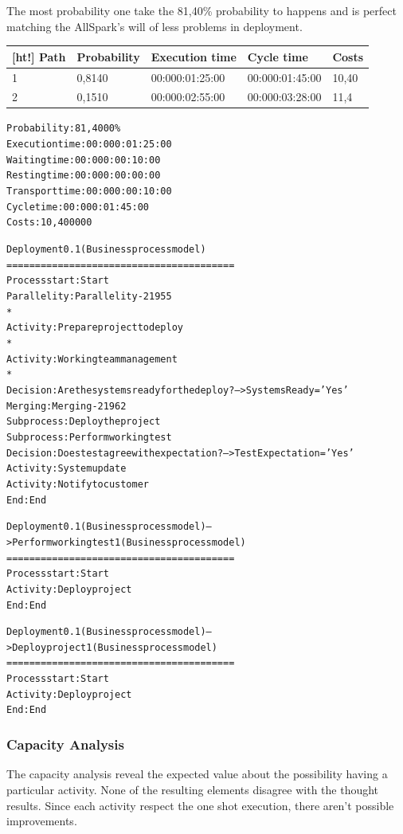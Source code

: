 The most probability one take the 81,40\% probability to happens and is perfect matching the AllSpark's will of less problems in deployment.

\begin{table}
\centering
\begin{tabular}{|l|l|l|l|l|}[ht!]
Path&Probability&Execution time&Cycle time&Costs\\
\hline
1&0,8140&00:000:01:25:00&00:000:01:45:00&10,40\\
\hline
2&0,1510&00:000:02:55:00&00:000:03:28:00&11,4\\
\hline
\end{tabular}
\end{table}

\begin{alltt}
Probability:   81,4000\%
Execution time:  00:000:01:25:00
Waiting time:  00:000:00:10:00
Resting time:  00:000:00:00:00
Transport time:  00:000:00:10:00
Cycle time:  00:000:01:45:00
Costs:  10,400000

Deployment 0.1 (Business process model)
========================================
Process start: Start
Parallelity: Parallelity-21955
    *
    Activity: Prepare project to deploy
    *
    Activity: Working team management
    *
    Decision: Are the systems ready for the deploy? --> SystemsReady='Yes'
Merging: Merging-21962
Subprocess: Deploy the project
Subprocess: Perform working test
Decision: Does test agree with expectation? --> TestExpectation='Yes'
Activity: System update
Activity: Notify to customer
End: End

Deployment 0.1 (Business process model) --> Perform working test 1 (Business process model)
========================================
Process start: Start
Activity: Deploy project
End: End

Deployment 0.1 (Business process model) --> Deploy project 1 (Business process model)
========================================
Process start: Start
Activity: Deploy project
End: End
\end{alltt}


\subsubsection{Capacity Analysis}
The capacity analysis reveal the expected value about the possibility having a particular activity. None of the resulting elements disagree with the thought results. Since each activity respect the one shot execution, there aren't possible improvements.

